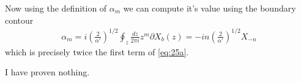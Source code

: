 \documentclass[aps,prd,final,twocolumn,floats,floatfix,nofootinbib,10pt]{revtex4-1}
\begin{document}
Now using the definition of $\alpha_m$ we can compute it's value using the
boundary contour
\begin{align}
  \alpha_m = i \left(\frac{2}{\alpha'} \right)^{1/2} \oint_z
  \frac{dz}{2 \pi i} z^m \partial X_b(z) =
  -in \left(\frac{2}{\alpha'} \right)^{1/2} X_{-n}
\end{align}
which is precisely twice the first term of \ref{eq:25a}.

I have proven nothing.
\end{document}
